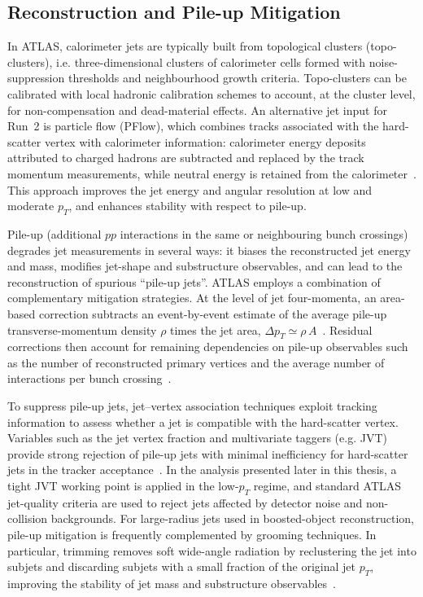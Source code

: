 \subsection{Reconstruction and Pile-up Mitigation} 
In ATLAS, calorimeter jets are typically built from topological clusters (topo-clusters), 
i.e. three-dimensional clusters of calorimeter cells formed with noise-suppression thresholds and neighbourhood growth criteria. 
Topo-clusters can be calibrated with local hadronic calibration schemes to account, at the cluster level, 
for non-compensation and dead-material effects. 
An alternative jet input for Run~2 is particle flow (PFlow), which combines tracks associated with the hard-scatter vertex with calorimeter information: calorimeter energy deposits attributed to charged hadrons are subtracted and replaced by the track momentum measurements, 
while neutral energy is retained from the calorimeter~\cite{ATLASParticleFlowJets2017}. 
This approach improves the jet energy and angular resolution at low and moderate $p_T$, 
and enhances stability with respect to pile-up. 

Pile-up (additional $pp$ interactions in the same or neighbouring bunch crossings) degrades jet measurements in several ways: 
it biases the reconstructed jet energy and mass, modifies jet-shape and substructure observables, 
and can lead to the reconstruction of spurious ``pile-up jets''. 
ATLAS employs a combination of complementary mitigation strategies. 
At the level of jet four-momenta, an area-based correction subtracts an event-by-event estimate of the average pile-up transverse-momentum density $\rho$ times the jet area, 
$\Delta p_T \simeq \rho\,A$~\cite{ATLASJetPileup2016,Cacciari2012FastJet}. 
Residual corrections then account for remaining dependencies on pile-up observables such as the number of reconstructed primary vertices and the average number of interactions per bunch crossing~\cite{ATLASJESJER13TeV2021}. 

To suppress pile-up jets, jet--vertex association techniques exploit tracking information to assess whether a jet is compatible with the hard-scatter vertex. 
Variables such as the jet vertex fraction and multivariate taggers (e.g. JVT) provide strong rejection of pile-up jets with minimal inefficiency for hard-scatter jets in the tracker acceptance~\cite{ATLASJetPileup2016,ATLASJESJER13TeV2021}. 
In the analysis presented later in this thesis, a tight JVT working point is applied in the low-$p_T$ regime, 
and standard ATLAS jet-quality criteria are used to reject jets affected by detector noise and non-collision backgrounds. 
For large-radius jets used in boosted-object reconstruction, pile-up mitigation is frequently complemented by grooming techniques. 
In particular, trimming removes soft wide-angle radiation by reclustering the jet into subjets and discarding subjets with a small fraction of the original jet $p_T$, 
improving the stability of jet mass and substructure observables~\cite{ATLASLargeRInSitu2019}. 

